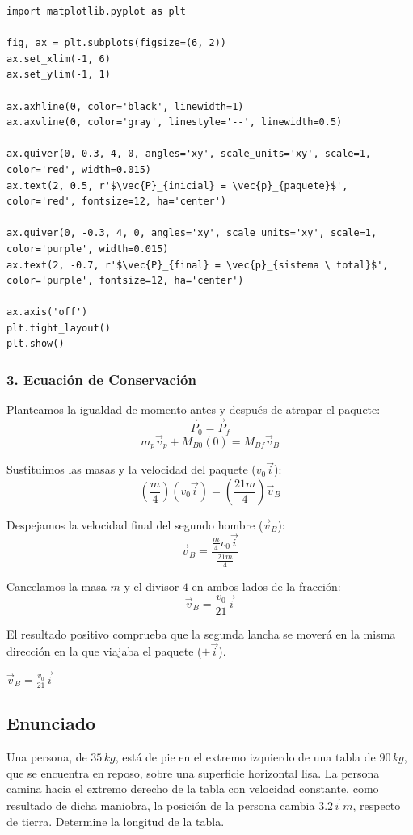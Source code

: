 \documentclass[12pt, a4paper]{article}
\begin{document}
\begin{lstlisting}
import matplotlib.pyplot as plt

fig, ax = plt.subplots(figsize=(6, 2))
ax.set_xlim(-1, 6)
ax.set_ylim(-1, 1)

ax.axhline(0, color='black', linewidth=1)
ax.axvline(0, color='gray', linestyle='--', linewidth=0.5)

ax.quiver(0, 0.3, 4, 0, angles='xy', scale_units='xy', scale=1, color='red', width=0.015)
ax.text(2, 0.5, r'$\vec{P}_{inicial} = \vec{p}_{paquete}$', color='red', fontsize=12, ha='center')

ax.quiver(0, -0.3, 4, 0, angles='xy', scale_units='xy', scale=1, color='purple', width=0.015)
ax.text(2, -0.7, r'$\vec{P}_{final} = \vec{p}_{sistema \ total}$', color='purple', fontsize=12, ha='center')

ax.axis('off')
plt.tight_layout()
plt.show()
\end{lstlisting}

\subsubsection*{3. Ecuación de Conservación}
Planteamos la igualdad de momento antes y después de atrapar el paquete:
\[ \vec{P}_0 = \vec{P}_f \]
\[ m_p \vec{v}_p + M_{B0}(0) = M_{Bf} \vec{v}_B \]

Sustituimos las masas y la velocidad del paquete ($v_0\vec{i}$):
\[ \left(\frac{m}{4}\right) (v_0\vec{i}) = \left( \frac{21m}{4} \right) \vec{v}_B \]

Despejamos la velocidad final del segundo hombre ($\vec{v}_B$):
\[ \vec{v}_B = \frac{\frac{m}{4} v_0\vec{i}}{\frac{21m}{4}} \]

Cancelamos la masa $m$ y el divisor $4$ en ambos lados de la fracción:
\[ \vec{v}_B = \frac{v_0}{21} \vec{i} \]

El resultado positivo comprueba que la segunda lancha se moverá en la misma dirección en la que viajaba el paquete ($+\vec{i}$).

\begin{tcolorbox}[colback=green!5!white, colframe=green!50!black, title=Respuesta Final]
\centering \Large $\vec{v}_B = \frac{v_0}{21} \vec{i}$
\end{tcolorbox}

\newpage

\subsection*{Enunciado}
Una persona, de $35 \, \si{kg}$, está de pie en el extremo izquierdo de una tabla de $90 \, \si{kg}$, que se encuentra en reposo, sobre una superficie horizontal lisa. La persona camina hacia el extremo derecho de la tabla con velocidad constante, como resultado de dicha maniobra, la posición de la persona cambia $3.2\vec{i} \, \si{m}$, respecto de tierra. Determine la longitud de la tabla.
\end{document}
